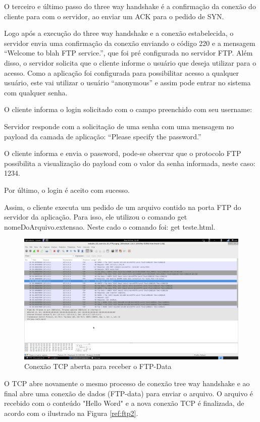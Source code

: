 O terceiro e último passo do three way handshake é a confirmação da conexão do cliente para
com o servidor, ao enviar um ACK para o pedido de SYN.

Logo  após a execução do three way handshake e a conexão estabelecida, o servidor envia uma
confirmação da conexão enviando o código 220 e a mensagem “Welcome to blah FTP service.”, que
foi pré configurada no servidor FTP. Além disso, o servidor solicita que o cliente informe o
 usuário que deseja utilizar para o acesso. Como a aplicação foi configurada para possibilitar
  acesso a qualquer usuário, este vai utilizar o usuário “anonymous” e assim pode entrar no
  sistema com qualquer senha.

O cliente informa o login solicitado com o campo preenchido com seu username:

Servidor responde com a solicitação de uma senha com uma mensagem no payload da camada de
aplicação: “Please specify the password.”

O cliente informa e envia o password, pode-se observar que o protocolo FTP possibilita
 a visualização do payload com o valor da senha informada, neste caso: 1234.


Por último, o login é aceito com sucesso.

Assim, o cliente executa um pedido de um arquivo contido na porta FTP do servidor da
 aplicação. Para isso, ele utilizou o comando get nomeDoArquivo.extensao. Neste cado o
  comando foi: get teste.html.

\begin{figure}[h]
  \centering

  \includegraphics[width=450px, scale=1]{figuras/ftp2}
  \caption{Conexão TCP aberta para receber o FTP-Data}

\label{fig:ftp2}
\end{figure}

O TCP abre novamente o mesmo processo de conexão tree way handshake e ao final abre
uma conexão de dados (FTP-data) para enviar o arquivo. O arquivo é recebido com o conteúdo
"Hello Word" e a nova
conexão TCP é finalizada, de acordo com o ilustrado na Figura \ref{ref:ftp2}.

